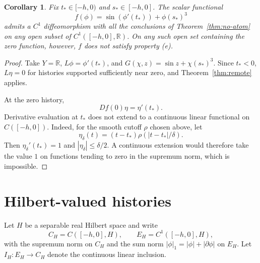 \documentclass[11pt]{article}
\newtheorem{corollary}[theorem]{Corollary}
\begin{document}
\begin{corollary}\label{cor:past}
Fix $t_*\in[-h,0)$ and $s_*\in[-h,0]$. The scalar functional
\begin{equation}\label{eq:past}
 f(\phi)=\sin(\phi'(t_*))+\phi(s_*)^3
\end{equation}
admits a $C^1$ diffeomorphism with all the conclusions of
Theorem~\ref{thm:no-atom} on any open subset of
$C^1([-h,0],\mathbb R)$. On any such open set containing
the zero function, however, $f$ does not satisfy property \textup{(e)}.
\end{corollary}
\begin{proof}
Take $Y=\mathbb R$, $L\phi=\phi'(t_*)$, and $G(\chi,z)=\sin z+\chi(s_*)^3$. Since $t_*<0$, $L\eta=0$ for histories supported sufficiently near zero, and Theorem~\ref{thm:remote} applies.

At the zero history,
\[
 Df(0)\eta=\eta'(t_*).
\]
Derivative evaluation at $t_*$ does not extend to a continuous
linear functional on $C([-h,0])$. Indeed, for the smooth cutoff
$\rho$ chosen above, let
\[
 \eta_\delta(t)=(t-t_*)\rho(|t-t_*|/\delta).
\]
Then $\eta_\delta'(t_*)=1$ and $|\eta_\delta|\le\delta/2$.
A continuous extension would therefore take the value $1$
on functions tending to zero in the supremum norm, which is
impossible.
\end{proof}


\section{Hilbert-valued histories}

Let $H$ be a separable real Hilbert space and write
\[
 C_H=C([-h,0],H),\qquad E_H=C^1([-h,0],H),
\]
with the supremum norm on $C_H$ and the sum norm
$|\phi|_1=|\phi|+|\partial\phi|$ on $E_H$.
Let $I_H:E_H\to C_H$ denote the continuous
linear inclusion.
\end{document}
